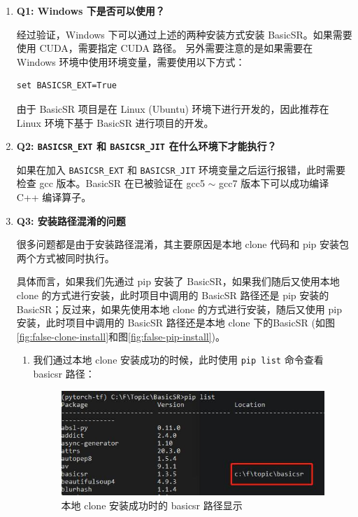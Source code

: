 \documentclass[../main.tex]{subfiles}
\begin{document}
\begin{enumerate}
    \item \textbf{Q1: Windows 下是否可以使用？}

    经过验证，Windows 下可以通过上述的两种安装方式安装 BasicSR。如果需要使用 CUDA，需要指定 CUDA 路径。	另外需要注意的是如果需要在 Windows 环境中使用环境变量，需要使用以下方式：
       \begin{verbatim}
set BASICSR_EXT=True
       \end{verbatim}

    由于 BasicSR 项目是在 Linux (Ubuntu) 环境下进行开发的，因此推荐在 Linux 环境下基于 BasicSR 进行项目的开发。

    \item \textbf{Q2: \texttt{BASICSR\_EXT} 和 \texttt{BASICSR\_JIT} 在什么环境下才能执行？}

    如果在加入 \texttt{BASICSR\_EXT} 和 \texttt{BASICSR\_JIT} 环境变量之后运行报错，此时需要检查 gcc 版本。BasicSR 在已被验证在 gcc5 $\sim$ gcc7 版本下可以成功编译 C++ 编译算子。

    \item \textbf{Q3: 安装路径混淆的问题}

    很多问题都是由于安装路径混淆，其主要原因是本地 clone 代码和 pip 安装包两个方式被同时执行。

    具体而言，如果我们先通过 pip 安装了 BasicSR，如果我们随后又使用本地 clone 的方式进行安装，此时项目中调用的 BasicSR 路径还是 pip 安装的 BasicSR；反过来，如果先使用本地 clone 的方式进行安装，随后又使用 pip 安装，此时项目中调用的 BasicSR 路径还是本地 clone 下的BasicSR (如图\ref{fig:false-clone-install}和图\ref{fig:false-pip-install})。

\begin{enumerate}
    \item 我们通过本地 clone 安装成功的时候，此时使用 \texttt{pip list} 命令查看 basicsr 路径：
    \begin{figure}[H]
    \begin{center}
        \includegraphics[width=0.7\linewidth]{figures/installation_clone_install_location.jpg}
        \caption{本地 clone 安装成功时的 basicsr 路径显示}
        \label{fig:correct-clone-install}
    \end{center}
    \vspace{-0.5cm}
    \end{figure}


\end{enumerate}
\end{enumerate}
\end{document}
